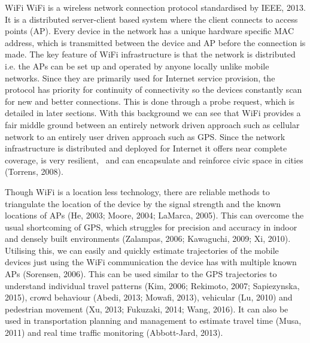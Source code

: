 WiFi WiFi is a wireless network connection protocol standardised by IEEE, 2013.
It is a distributed server-client based system where the client connects to
access points (AP). Every device in the network has a unique hardware specific
MAC address, which is transmitted between the device and AP before the
connection is made. The key feature of WiFi infrastructure is that the network
is distributed i.e. the APs can be set up and operated by anyone locally unlike
mobile networks. Since they are primarily used for Internet service provision,
the protocol has priority for continuity of connectivity so the devices
constantly scan for new and better connections. This is done through a probe
request, which is detailed in later sections. With this background we can see
that WiFi provides a fair middle ground between an entirely network driven
approach such as cellular network to an entirely user driven approach such as
GPS. Since the network infrastructure is distributed and deployed for Internet
it offers near complete coverage, is very resilient,  and can encapsulate and
reinforce civic space in cities (Torrens, 2008).


Though WiFi is a location less technology, there are reliable methods to
triangulate the location of the device by the signal strength and the known
locations of APs (He, 2003; Moore, 2004; LaMarca, 2005). This can overcome the
usual shortcoming of GPS, which struggles for precision and accuracy in indoor
and densely built environments (Zalampas, 2006; Kawaguchi, 2009; Xi, 2010).
Utilising this, we can easily and quickly estimate trajectories of the mobile
devices just using the WiFi communication the device has with multiple known APs
(Sorensen, 2006). This can be used similar to the GPS trajectories to understand
individual travel patterns (Kim, 2006; Rekimoto, 2007; Sapiezynska, 2015), crowd
behaviour (Abedi, 2013; Mowafi, 2013), vehicular (Lu, 2010) and pedestrian
movement (Xu, 2013; Fukuzaki, 2014; Wang, 2016). It can also be used in
transportation planning and management to estimate travel time (Musa, 2011) and
real time traffic monitoring (Abbott-Jard, 2013).


